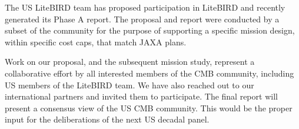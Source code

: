 The US LiteBIRD team has proposed participation in LiteBIRD and recently generated its Phase A 
report. The proposal and report were conducted by 
a subset of the community for the purpose of supporting a specific mission design, within specific 
cost caps, that match JAXA plans. 

Work on our proposal, and 
the subsequent mission study, represent a collaborative effort by all interested members of the 
CMB community, including US members of the LiteBIRD team. We have also reached out to our international partners 
and invited them to participate. The final report will present a consensus view of the US CMB community. 
This would be the proper input for the deliberations of the next US decadal panel. 



























